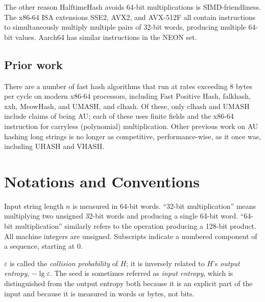 \documentclass[runningheads]{llncs}
\begin{document}

The other reason HalftimeHash avoids 64-bit multiplications is SIMD-friend\-li\-ness.
The x86-64 ISA extensions SSE2, AVX2, and AVX-512F all contain instructions to simultaneously multiply multiple pairs of 32-bit words, producing multiple 64-bit values.
Aarch64 has similar instructions in the NEON set.


\subsection{Prior work}

There are a number of fast hash algorithms that run at rates exceeding 8 bytes per cycle on modern x86-64 processors, including Fast Positive Hash, falk\-hash, xxh, Meow\-Hash, and UMASH, and cl\-hash. \cite{smhasher}
Of these, only cl\-hash and U\-MASH include claims of being AU; each of these uses finite fields and the x86-64 instruction for carryless (polynomial) multiplication.
Other previous work on AU hashing long strings is no longer as competitive, performance-wise, as it once was, including UHASH and VHASH. \cite{clhash,umac,vmac}



\section{Notations and Conventions}

Input string length $n$ is measured in 64-bit words.
``32-bit multiplication'' means multiplying two unsigned 32-bit words and producing a single 64-bit word.
``64-bit multiplication'' similarly refers to the operation producing a 128-bit product.
All machine integers are unsigned.
Subscripts indicate a numbered component of a sequence, starting at 0.

$\varepsilon$ is called the {\em collision probability} of $H$; it is inversely related to $H$'s {\em output entropy}, $-\lg \varepsilon$.
The seed is sometimes referred as {\em input entropy}, which is distinguished from the output entropy both because it is an explicit part of the input and because it is measured in words or bytes, not bits.
\end{document}
